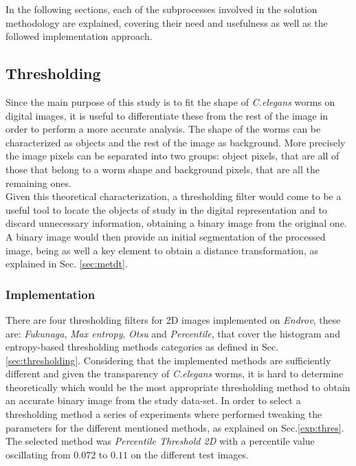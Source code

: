 In the following sections, each of the subprocesses involved in the solution
methodology are explained, covering their need and usefulness as
well as the followed implementation approach.

  

\subsection{Thresholding}
\label{sec:metthres}

Since the main purpose of this study is to fit the shape of \emph{C.elegans} worms on digital
images, it is useful to differentiate these from the rest of the image in order to perform a more 
accurate analysis. The shape of the worms
can be characterized as objects and the rest of the image as background. More precisely
the image pixels can be separated into two groups: object pixels, that are all of those
that belong to a worm shape and background pixels, that are all the remaining ones.\\

Given this theoretical characterization, a thresholding filter would come to be a useful tool 
to locate the objects of study in the digital representation and to discard unnecessary 
information, obtaining a binary image from the original one. A binary image would then provide
an initial segmentation of the processed image, being as well a key element to obtain
a distance transformation, as explained in Sec. \ref{sec:metdt}.

\subsubsection{Implementation}
\label{sec:thresimp}
There are four thresholding filters for 2D images implemented on \emph{Endrov}, these are: 
\emph{Fukunaga}, \emph{Max entropy}, \emph{Otsu} and \emph{Percentile}, that cover the 
histogram and entropy-based thresholding methods categories as defined in Sec.\ref{sec:thresholding}.
Considering that the implemented methods are sufficiently different and given the transparency
of \emph{C.elegans} worms, it is hard to determine theoretically which would be the most appropriate 
thresholding method to obtain an accurate binary image from the study data-set. In order 
to select a thresholding method a series of experiments where performed tweaking the parameters
for the different mentioned methods, as explained on Sec.\ref{exp:thres}.
The selected method was \emph{Percentile Threshold 2D} with a percentile value oscillating from
$0.072$ to $0.11$ on the different test images.\\

